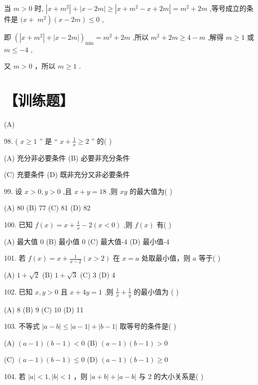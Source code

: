 \documentclass[10pt]{article}
\begin{document}
当 \(m > 0\) 时, \(\left| {x + {m}^{2}}\right|  + \left| {x - {2m}}\right|  \geq  \left| {x + {m}^{2} - x + {2m}}\right|  = {m}^{2} + {2m}\) ,等号成立的条件是 \((x + \; \left. {m}^{2}\right) \left( {x - {2m}}\right)  \leq  0\) ,

即 \({\left( \left| x + {m}^{2}\right|  + \left| x - 2m\right| \right) }_{\min } = {m}^{2} + {2m}\) ,所以 \({m}^{2} + {2m} \geq  4 - m\) ,解得 \(m \geq  1\) 或 \(m \leq   - 4\) ,

又 \(m > 0\) ，所以 \(m \geq  1\) .

\section*{【训练题】}

(A)

98. ( \(x \geq  1\) ” 是 “ \(x + \frac{1}{x} \geq  2\) ” 的( )

(A) 充分非必要条件 (B) 必要非充分条件

(C) 充要条件 (D) 既非充分又非必要条件

99. 设 \(x > 0,y > 0\) ,且 \(x + y = {18}\) ,则 \({xy}\) 的最大值为( )

(A) 80 (B) 77 (C) 81 (D) 82

100. 已知 \(f\left( x\right)  = x + \frac{1}{x} - 2\left( {x < 0}\right)\) ,则 \(f\left( x\right)\) 有(   )

(A) 最大值 0 (B) 最小值 0 (C) 最大值-4 (D) 最小值-4

101. 若 \(f\left( x\right)  = x + \frac{1}{x - 2}\left( {x > 2}\right)\) 在 \(x = a\) 处取最小值，则 \(a\) 等于( )

(A) \(1 + \sqrt{2}\) (B) \(1 + \sqrt{3}\) (C) 3 (D) 4

102. 已知 \(x,y > 0\) 且 \(x + {4y} = 1\) ,则 \(\frac{1}{x} + \frac{1}{y}\) 的最小值为 ( )

(A) 8 (B) 9 (C) 10 (D) 11

103. 不等式 \(\left| {a - b}\right|  \leq  \left| {a - 1}\right|  + \left| {b - 1}\right|\) 取等号的条件是( )

(A) \(\left( {a - 1}\right) \left( {b - 1}\right)  < 0\) (B) \(\left( {a - 1}\right) \left( {b - 1}\right)  > 0\)

(C) \(\left( {a - 1}\right) \left( {b - 1}\right)  \leq  0\) (D) \(\left( {a - 1}\right) \left( {b - 1}\right)  \geq  0\)

104. 若 \(\left| a\right|  < 1,\left| b\right|  < 1\) ，则 \(\left| {a + b}\right|  + \left| {a - b}\right|\) 与 2 的大小关系是( )
\end{document}
